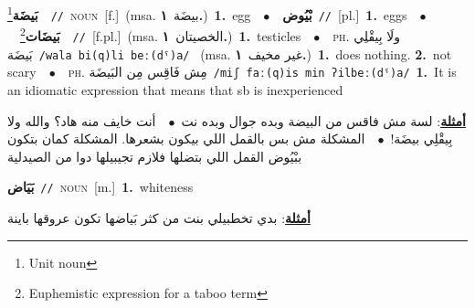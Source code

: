 \documentclass[10pt,a4paper,twoside]{article} %
\begin{document}
\begin{multicols}{2}
{\setlength\topsep{0pt}\textbf{\foreignlanguage{arabic}{بَيضَة}}\footnote{Unit noun}\ \ {\color{gray}\texttt{//}\color{black}}\ \textsc{noun}\ [f.]\ \color{gray}(msa. \foreignlanguage{arabic}{بيضَة}~\foreignlanguage{arabic}{\textbf{١.}})\color{black}\ \textbf{1.}~egg\ \ $\bullet$\ \ \setlength\topsep{0pt}\textbf{\foreignlanguage{arabic}{بْيُوض}}\ {\color{gray}\texttt{//}\color{black}}\ [pl.]\ \textbf{1.}~eggs\ \ $\bullet$\ \ \setlength\topsep{0pt}\textbf{\foreignlanguage{arabic}{بَيضَات}}\footnote{Euphemistic expression for a taboo term}\ \ {\color{gray}\texttt{//}\color{black}}\ [f.pl.]\ \color{gray}(msa. \foreignlanguage{arabic}{الخصيتان}~\foreignlanguage{arabic}{\textbf{١.}})\color{black}\ \textbf{1.}~testicles\ \ $\bullet$\ \ \textsc{ph.} \color{gray} \foreignlanguage{arabic}{ولَا بِيقْلِي بَيضَة}\color{black}\ {\color{gray}\texttt{/{\sffamily wala bi(q)li beː(dˤ)a}/}\color{black}}\ \color{gray} (msa. \foreignlanguage{arabic}{غير مخيف}~\foreignlanguage{arabic}{\textbf{١.}})\color{black}\ \textbf{1.}~does nothing.  \textbf{2.}~not scary\ \ $\bullet$\ \ \textsc{ph.} \color{gray} \foreignlanguage{arabic}{مِش فَاقِس مِن البَيضَة}\color{black}\ {\color{gray}\texttt{/{\sffamily miʃ faː(q)is min ʔilbeː(dˤ)a}/}\color{black}}\ \textbf{1.}~It is an idiomatic expression that means that sb is inexperienced\  \begin{flushright}\color{gray}\foreignlanguage{arabic}{\textbf{\underline{\foreignlanguage{arabic}{أمثلة}}}: لسة مش فاقس من البيضة وبده جوال وبده نت\ $\bullet$\ \  أنت خايف منه هاد؟ والله ولا بِيقْلِي بيضَة!\ $\bullet$\ \  المشكلة مش بس بالقمل اللي بيكون بشعرها. المشكلة كمان بتكون ببْيُوض القمل اللي بتضلها فلازم تجيبيلها دوا من الصيدلية}\end{flushright}\color{black}} \vspace{2mm}

{\setlength\topsep{0pt}\textbf{\foreignlanguage{arabic}{بَيَاض}}\ {\color{gray}\texttt{//}\color{black}}\ \textsc{noun}\ [m.]\ \textbf{1.}~whiteness\  \begin{flushright}\color{gray}\foreignlanguage{arabic}{\textbf{\underline{\foreignlanguage{arabic}{أمثلة}}}: بدي تخطبيلي بنت من كثر بَياضها تكون عروقها باينة}\end{flushright}\color{black}} \vspace{2mm}


\end{multicols}
\end{document}
